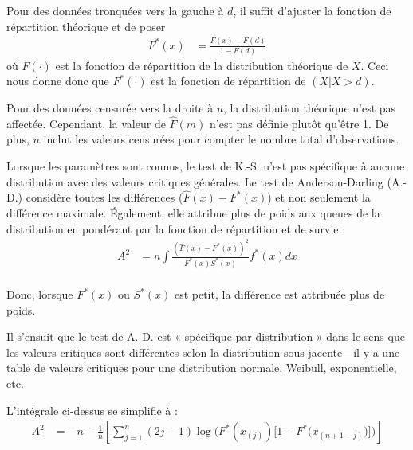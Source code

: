\documentclass[french]{article}
\begin{document}
\begin{multicols*}{2}
\begin{definitionNOHFILLsub}
Pour des données tronquées vers la gauche à $d$, il suffit d'ajuster la fonction de répartition théorique et de poser 
\begin{align*}
	F^{\ast}(x)
	&=	\frac{F(x) - F(d)}{1 - F(d)}
\end{align*}
où $F(\cdot)$ est la fonction de répartition de la distribution théorique de $X$. Ceci nous donne donc que $F^{\ast}(\cdot)$ est la fonction de répartition de $(X | X > d)$.

\bigskip

Pour des données censurée vers la droite à $u$, la distribution théorique n'est pas affectée. Cependant, la valeur de $\hat{F}(m)$ n'est pas définie plutôt qu'être 1. De plus, $n$ inclut les valeurs censurées pour compter le nombre total d'observations.
\end{definitionNOHFILLsub}

Lorsque les paramètres sont connus, le test de K.-S. n'est pas spécifique à aucune distribution avec des valeurs critiques générales. Le test de Anderson-Darling (A.-D.) considère toutes les différences ($\hat{F}(x)	-	F^{\ast}(x)$) et non seulement la différence maximale. Également, elle attribue plus de poids aux queues de la distribution en pondérant par la fonction de répartition et de survie :
\begin{align*}
	A^{2}
	&=	n \int  \frac{(\hat{F}(x)	-	F^{\ast}(x))^{2}}{F^{\ast}(x) S^{\ast}(x)}f^{\ast}(x) dx	\\
\end{align*}

Donc, lorsque $F^{\ast}(x)$ ou $S^{\ast}(x)$ est petit, la différence est attribuée plus de poids.

\bigskip

Il s'ensuit que le test de A.-D. est « spécifique par distribution » dans le sens que les valeurs critiques sont différentes selon la distribution sous-jacente---il y a une table de valeurs critiques pour une distribution normale, Weibull, exponentielle, etc.

\begin{definitionNOHFILLsub}
L'intégrale ci-dessus se simplifie à :
\begin{align*}
	A^{2}
	&=	-n	-\frac{1}{n} \left[
		\sum_{j = 1}^{n} (2j - 1)\log\bigg(F^{\ast}(x_{(j)})\Big[1	-	F^{\ast}\big(x_{(n + 1 - j)}\big)\Big]\bigg)
	\right]
\end{align*}
\end{definitionNOHFILLsub}


\end{multicols*}
\end{document}
